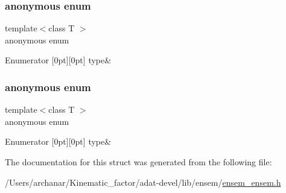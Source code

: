 \subsubsection{\texorpdfstring{anonymous enum}{anonymous enum}}
{\footnotesize\ttfamily template$<$class T $>$ \\
anonymous enum}

\begin{DoxyEnumFields}{Enumerator}
[0pt][0pt]{}\mbox{\label{structENSEM_1_1EnsbcIO_3_01EScalar_3_01T_01_4_01_4_a698bb58bb4e12b6da201a1119e261216a91b43cfd0a234b7ecf01fb42ee56c00b}} 
type&\\
\hline

\end{DoxyEnumFields}
\mbox{\label{structENSEM_1_1EnsbcIO_3_01EScalar_3_01T_01_4_01_4_a698bb58bb4e12b6da201a1119e261216}} 
\subsubsection{\texorpdfstring{anonymous enum}{anonymous enum}}
{\footnotesize\ttfamily template$<$class T $>$ \\
anonymous enum}

\begin{DoxyEnumFields}{Enumerator}
[0pt][0pt]{}\mbox{\label{structENSEM_1_1EnsbcIO_3_01EScalar_3_01T_01_4_01_4_a698bb58bb4e12b6da201a1119e261216a91b43cfd0a234b7ecf01fb42ee56c00b}} 
type&\\
\hline

\end{DoxyEnumFields}


The documentation for this struct was generated from the following file\+:\begin{DoxyCompactItemize}
\item 
/\+Users/archanar/\+Kinematic\+\_\+factor/adat-\/devel/lib/ensem/\mbox{\hyperlink{adat-devel_2lib_2ensem_2ensem__ensem_8h}{ensem\+\_\+ensem.\+h}}\end{DoxyCompactItemize}
